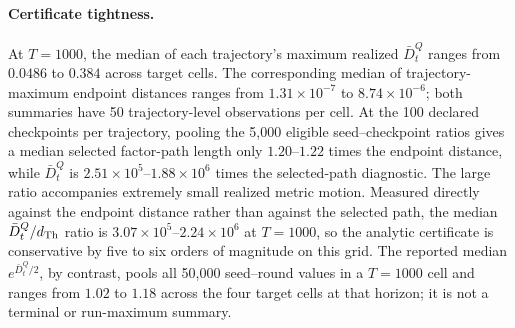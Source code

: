 \begin{ccewidefloat}
  \caption{Original near-linear audit for the transport-Hessian policy.
  Coverage is run-level simultaneous coverage with exact Clopper--Pearson
  intervals.  The two median-maximum columns first maximize within each
  trajectory, then take the median over 50 runs per cell.  ``Event viol.'' counts
  theorem-bound violations only when the joint confidence premise holds.  All
  values come from the full evaluation; smoke and tuning runs are excluded.}
  \label{tab:transport-instantiation-validity}

\end{ccewidefloat}

\paragraph{Certificate tightness.}
At $T=1000$, the median of each trajectory's maximum realized $\bar D_t^Q$
ranges from $0.0486$ to $0.384$ across target cells.  The corresponding median
of trajectory-maximum endpoint distances ranges from $1.31\times10^{-7}$ to
$8.74\times10^{-6}$; both summaries have 50 trajectory-level observations per
cell.  At the 100 declared checkpoints per trajectory, pooling the 5,000
eligible seed--checkpoint ratios gives a median selected factor-path length only
$1.20$--$1.22$ times the endpoint distance, while $\bar D_t^Q$ is
$2.51\times10^5$--$1.88\times10^6$ times the selected-path diagnostic.  The
large ratio accompanies extremely small realized metric motion.  Measured
directly against the endpoint distance rather than against the selected path,
the median $\bar D_t^Q/d_{\rm Th}$ ratio is $3.07\times10^5$--$2.24\times10^6$
at $T=1000$, so the analytic certificate is conservative by five to six orders
of magnitude on this grid.  The reported
median $e^{\bar D_t^Q/2}$, by contrast, pools all 50,000 seed--round values in a
$T=1000$ cell and ranges from $1.02$ to $1.18$ across the four target cells at
that horizon; it is not a terminal or run-maximum summary.

